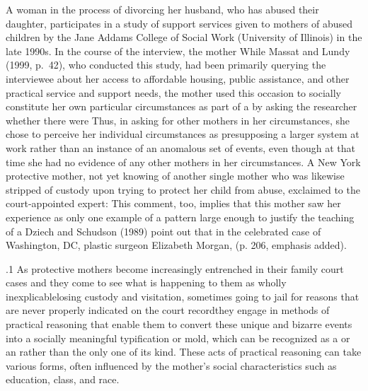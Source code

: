\documentclass[11pt, twoside]{article}
\begin{document}
{{\begin{docEnumerate}
\enumsItem{}  A woman in the process of divorcing her husband, who has
abused their daughter, participates in a study of support
services given to mothers of abused children by the Jane
Addams College of Social Work (University of Illinois) in the
late 1990s. In the course of the interview, the mother  While Massat and Lundy (1999, p.~42), who
conducted this study, had been primarily querying the
interviewee about her access to affordable housing, public
assistance, and other practical service and support needs, the
mother used this occasion to socially constitute her own
particular circumstances as part of a  by asking the
researcher whether there were  Thus, in asking for other mothers in her
circumstances, she chose to perceive her individual
circumstances as presupposing a larger system at work rather
than an instance of an anomalous set of events, even though at
that time she had no evidence of any other mothers in her
circumstances.
\enumsItem{} A New York protective mother, not yet knowing of another
single mother who was likewise stripped of custody upon
trying to protect her child from abuse, exclaimed to the
court-appointed expert:  This comment, too, implies that
this mother saw her experience as only one example of a
pattern large enough to justify the teaching of a 
\enumsItem{}  Dziech and Schudson (1989) point out that in the celebrated
case of Washington, DC, plastic surgeon Elizabeth Morgan,
 (p. 206, emphasis added).

\end{docEnumerate}

}%

\p.1{%
As protective mothers become increasingly entrenched in their family court cases and they come to see what is happening to them as wholly
inexplicable\mdash{}losing custody and visitation, sometimes going to jail for
reasons that are never properly indicated on the court record\mdash{}they
engage in methods of practical reasoning that enable them to convert
these unique and bizarre events into a socially meaningful typification or
mold, which can be recognized as a  or an  rather than
the only one of its kind. These acts of practical reasoning can take various forms, often influenced by the mother’s social characteristics such
as education, class, and race.
}%

}
\end{document}
